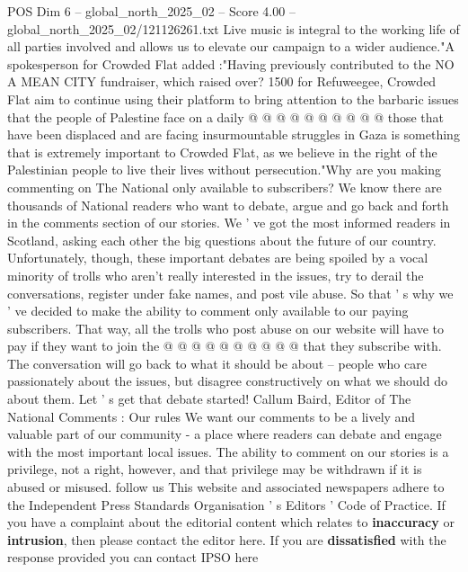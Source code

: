 \begin{textsample}{POS Dim 6 – global\_north\_2025\_02 – Score 4.00 – global\_north\_2025\_02/121126261.txt}
Live music is integral to the working life of all parties involved and allows us to elevate our campaign to a wider audience."A spokesperson for Crowded Flat added :"Having previously contributed to the NO A MEAN CITY fundraiser, which raised over? 1500 for Refuweegee, Crowded Flat aim to continue using their platform to bring attention to the barbaric issues that the people of Palestine face on a daily @ @ @ @ @ @ @ @ @ @ those that have been displaced and are facing insurmountable struggles in Gaza is something that is extremely important to Crowded Flat, as we believe in the right of the Palestinian people to live their lives without persecution."Why are you making commenting on The National only available to subscribers?
We know there are thousands of National readers who want to debate, argue and go back and forth in the comments section of our stories.
We ' ve got the most informed readers in Scotland, asking each other the big questions about the future of our country.
Unfortunately, though, these important debates are being spoiled by a vocal minority of trolls who aren't really interested in the issues, try to derail the conversations, register under fake names, and post vile abuse.
So that ' s why we ' ve decided to make the ability to comment only available to our paying subscribers.
That way, all the trolls who post abuse on our website will have to pay if they want to join the @ @ @ @ @ @ @ @ @ @ that they subscribe with.
The conversation will go back to what it should be about -- people who care passionately about the issues, but disagree constructively on what we should do about them.
Let ' s get that debate started!
Callum Baird, Editor of The National Comments : Our rules We want our comments to be a lively and valuable part of our community - a place where readers can debate and engage with the most important local issues.
The ability to comment on our stories is a privilege, not a right, however, and that privilege may be withdrawn if it is abused or misused. follow us This website and associated newspapers adhere to the Independent Press Standards Organisation ' s Editors ' Code of Practice.
If you have a complaint about the editorial content which relates to \textbf{inaccuracy} or \textbf{intrusion}, then please contact the editor here.
If you are \textbf{dissatisfied} with the response provided you can contact IPSO here

\end{textsample}
